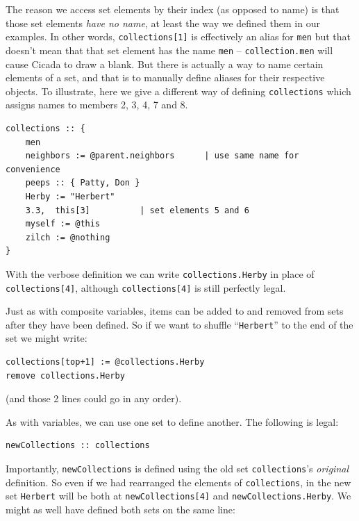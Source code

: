 \documentclass{article}
\newenvironment{code}{
       \begin{list}{}{
               \setlength{\leftmargin}{.4in}
               \setlength{\rightmargin}{0in}
               \setlength{\topsep}{.2in}
       }
       \small
       \item[] }
       { \end{list}   }
\begin{document}
The reason we access set elements by their index (as opposed to name) is that those set elements \emph{have no name}, at least the way we defined them in our examples.  In other words, \verb#collections[1]# is effectively an alias for \verb#men# but that doesn't mean that that set element has the name \verb#men# -- \texttt{collection.men} will cause Cicada to draw a blank.  But there is actually a way to name certain elements of a set, and that is to manually define aliases for their respective objects.  To illustrate, here we give a different way of defining \texttt{collections} which assigns names to members 2, 3, 4, 7 and 8.

\begin{code} \begin{verbatim}
collections :: {
    men
    neighbors := @parent.neighbors      | use same name for convenience
    peeps :: { Patty, Don }
    Herby := "Herbert"
    3.3,  this[3]          | set elements 5 and 6
    myself := @this
    zilch := @nothing
}
\end{verbatim} \end{code}

\noindent With the verbose definition we can write \texttt{collections.Herby} in place of \texttt{collections[4]}, although \texttt{collections[4]} is still perfectly legal.

Just as with composite variables, items can be added to and removed from sets after they have been defined.  So if we want to shuffle ``\texttt{Herbert}'' to the end of the set we might write:

\begin{code} \begin{verbatim}
collections[top+1] := @collections.Herby
remove collections.Herby
\end{verbatim} \end{code}

\noindent (and those 2 lines could go in any order).

As with variables, we can use one set to define another.  The following is legal:

\begin{code} \begin{verbatim}
newCollections :: collections
\end{verbatim} \end{code}

\noindent Importantly, \verb#newCollections# is defined using the old set \verb#collections#'s \emph{original} definition.  So even if we had rearranged the elements of \verb#collections#, in the new set \verb#Herbert# will be both at \verb#newCollections[4]# and \verb#newCollections.Herby#.  We might as well have defined both sets on the same line:
\end{document}
